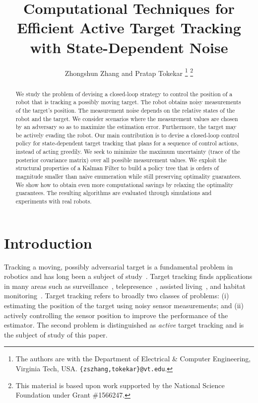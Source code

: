 \documentclass[journal]{IEEEtran}
\begin{document}
\title{Computational Techniques for Efficient Active Target Tracking with State-Dependent Noise}

\author{Zhongshun Zhang and Pratap Tokekar%
\thanks{The authors are with the Department of Electrical \& Computer Engineering, Virginia Tech, USA. \texttt{\small \{zszhang,tokekar\}@vt.edu}.}%
\thanks{This material is based upon work supported by the National Science Foundation under Grant \#1566247.}}

\maketitle

\begin{abstract}
We study the problem of devising a closed-loop strategy to control the position of a robot that is tracking a possibly moving target. The robot obtains noisy measurements of the target's position. The measurement noise depends on the relative states of the robot and the target. We consider scenarios where the measurement values are chosen by an adversary so as to maximize the estimation error. Furthermore, the target may be actively evading the robot. Our main contribution is to devise a closed-loop control policy for state-dependent target tracking that plans for a sequence of control actions, instead of acting greedily. We seek to minimize the maximum uncertainty (trace of the posterior covariance matrix) over all possible measurement values. We exploit the structural properties of a Kalman Filter to build a policy tree that is orders of magnitude smaller than naive enumeration while still preserving optimality guarantees. We show how to obtain even more computational savings by relaxing the optimality guarantees. The resulting algorithms are evaluated through simulations and experiments with real robots.
\end{abstract}

\IEEEpeerreviewmaketitle



\section{Introduction}
Tracking a moving, possibly adversarial target is a fundamental problem in robotics and has long been a subject of study~\cite{bar2004estimation,li2003survey,li2010survey,li2001survey,li2002survey,li2005survey}. Target tracking finds applications in many areas such as surveillance~\cite{rao1993fully}, telepresence~\cite{karnad2012modeling}, assisted living~\cite{montemerlo2002experiences}, and habitat monitoring~\cite{isler2015finding,tokekar2013tracking}. Target tracking refers to broadly two classes of problems: (i) estimating the position of the target using noisy sensor measurements; and (ii) actively controlling the sensor position to improve the performance of the estimator. The second problem is distinguished as \emph{active} target tracking and is the subject of study of this paper. 
\end{document}
